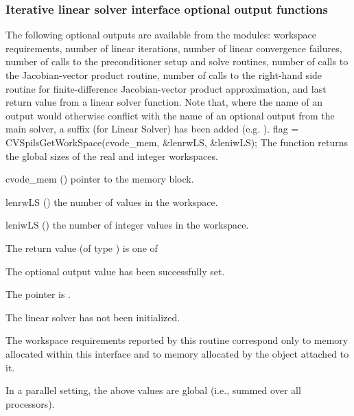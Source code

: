 \subsubsection{Iterative linear solver interface optional output functions}
\label{sss:optout_spils}
The following optional outputs are available from the {\cvspils}
modules: workspace requirements, number of linear iterations, number of
linear convergence failures, number of calls to the preconditioner
setup and solve routines, number of calls to the Jacobian-vector
product routine, number of calls to the right-hand side routine for
finite-difference Jacobian-vector product approximation, and last
return value from a linear solver function.
Note that, where the name of an output would otherwise conflict with
the name of an optional output from the main solver, a suffix 
(for Linear Solver) has been added (e.g.  ).
{
  flag = CVSpilsGetWorkSpace(cvode\_mem, \&lenrwLS, \&leniwLS);
}
{
  The function  returns the global sizes of the
  {\cvspils} real and integer workspaces.
}
{
  \begin{args}
  \item[cvode\_mem] ()
    pointer to the {\cvode} memory block.
  \item[lenrwLS] ()
    the number of  values in the {\cvspils} workspace.
  \item[leniwLS] ()
    the number of integer values in the {\cvspils} workspace.
  \end{args}
}
{
  The return value  (of type ) is one of
  \begin{args}
  \item[\Id{CVSPILS\_SUCCESS}] 
    The optional output value has been successfully set.
  \item[\Id{CVSPILS\_MEM\_NULL}]
    The  pointer is .
  \item[\Id{CVSPILS\_LMEM\_NULL}]
    The {\cvspils} linear solver has not been initialized.
  \end{args}
}
{
  The workspace requirements reported by this routine correspond only
  to memory allocated within this interface and to memory allocated by
  the {\sunlinsol} object attached to it.

  In a parallel setting, the above values are global (i.e., summed over all
  processors).
}
